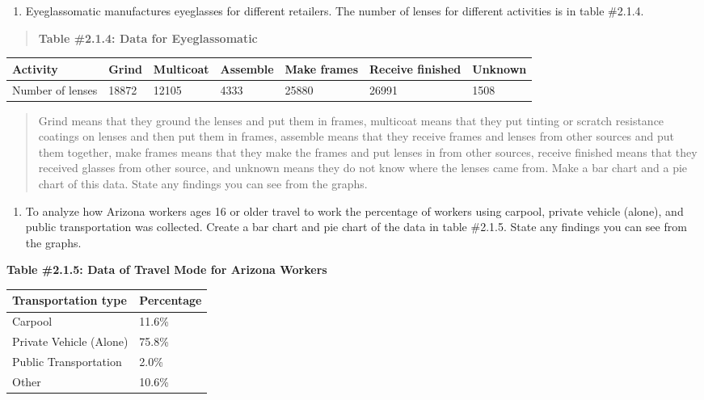 \documentclass[]{book}
\providecommand{\tightlist}{%
  \setlength{\itemsep}{0pt}\setlength{\parskip}{0pt}}
\begin{document}
\begin{enumerate}
\def\labelenumi{\arabic{enumi}.}
\tightlist
\item
  Eyeglassomatic manufactures eyeglasses for different retailers. The
  number of lenses for different activities is in table \#2.1.4.
\end{enumerate}

\begin{quote}
\textbf{Table \#2.1.4: Data for Eyeglassomatic}
\end{quote}

\begin{longtable}[]{@{}lllllll@{}}
\toprule
Activity & Grind & Multicoat & Assemble & Make frames & Receive finished & Unknown\tabularnewline
\midrule
\endhead
Number of lenses & 18872 & 12105 & 4333 & 25880 & 26991 & 1508\tabularnewline
\bottomrule
\end{longtable}

\begin{quote}
Grind means that they ground the lenses and put them in frames,
multicoat means that they put tinting or scratch resistance coatings
on lenses and then put them in frames, assemble means that they
receive frames and lenses from other sources and put them together,
make frames means that they make the frames and put lenses in from
other sources, receive finished means that they received glasses from
other source, and unknown means they do not know where the lenses came
from. Make a bar chart and a pie chart of this data. State any
findings you can see from the graphs.
\end{quote}

\begin{enumerate}
\def\labelenumi{\arabic{enumi}.}
\setcounter{enumi}{1}
\tightlist
\item
  To analyze how Arizona workers ages 16 or older travel to work the
  percentage of workers using carpool, private vehicle (alone), and
  public transportation was collected. Create a bar chart and pie
  chart of the data in table \#2.1.5. State any findings you can see
  from the graphs.
\end{enumerate}

\textbf{Table \#2.1.5: Data of Travel Mode for Arizona Workers}

\begin{longtable}[]{@{}ll@{}}
\toprule
Transportation type & Percentage\tabularnewline
\midrule
\endhead
Carpool & 11.6\%\tabularnewline
Private Vehicle (Alone) & 75.8\%\tabularnewline
Public Transportation & 2.0\%\tabularnewline
Other & 10.6\%\tabularnewline
\bottomrule
\end{longtable}
\end{document}
